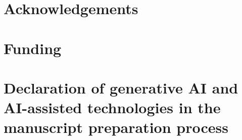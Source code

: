 \documentclass[preprint,12pt]{elsarticle}
\begin{document}
\section*{Acknowledgements}


\section*{Funding}


\section*{Declaration of generative AI and AI-assisted technologies in the manuscript preparation process}




\end{document}
